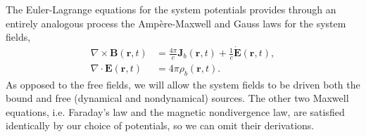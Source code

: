 The Euler-Lagrange equations for the system potentials provides through an entirely analogous process the Amp\`{e}re-Maxwell and Gauss laws for the system fields,
\begin{equation}
\begin{split}
\nabla\times\mathbf{B}(\mathbf{r},t) &= \frac{4\pi}{c}\mathbf{J}_b(\mathbf{r},t) + \frac{1}{c}\dot{\mathbf{E}}(\mathbf{r},t),\\
\nabla\cdot\mathbf{E}(\mathbf{r},t) &= 4\pi\rho_b(\mathbf{r},t).
\end{split}
\end{equation}
As opposed to the free fields, we will allow the system fields to be driven both the bound and free (dynamical and nondynamical) sources. The other two Maxwell equations, i.e. Faraday's law and the magnetic nondivergence law, are satisfied identically by our choice of potentials, so we can omit their derivations. 

